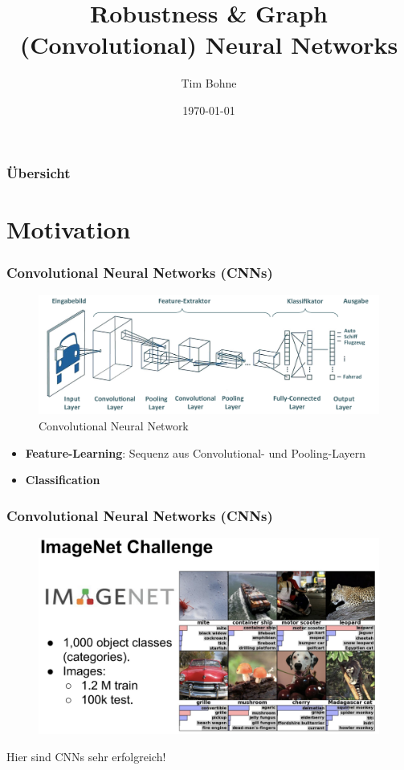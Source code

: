 \documentclass{beamer}
\title[]{Robustness \& Graph (Convolutional) Neural Networks}
\author{Tim Bohne}
\institute[]
{
\textit{Machine Learning Seminar 20/21}
\medskip
}
\date{\today}
\begin{document}
\begin{frame}[plain] %
\titlepage %
\end{frame}

\begin{frame}
\frametitle{Übersicht} %
\tableofcontents
\end{frame}

\section{Motivation}

\begin{frame}
  \frametitle{Convolutional Neural Networks (CNNs)}
  \begin{figure}
    \centering
    \includegraphics[width=\textwidth]{img/CNN.png}
    \caption*{Convolutional Neural Network \cite{Zschech2020}}
  \end{figure}
  \begin{itemize}
    \item \textbf{Feature-Learning}: Sequenz aus Convolutional- und Pooling-Layern
    \item \textbf{Classification}
  \end{itemize}
\end{frame}

\begin{frame}
  \frametitle{Convolutional Neural Networks (CNNs)}
  \begin{figure}
    \centering
    \includegraphics[width=\textwidth]{img/imagenet.png}
    \caption*{ \cite{}}
  \end{figure}
  Hier sind CNNs sehr erfolgreich!
\end{frame}
\end{document}
